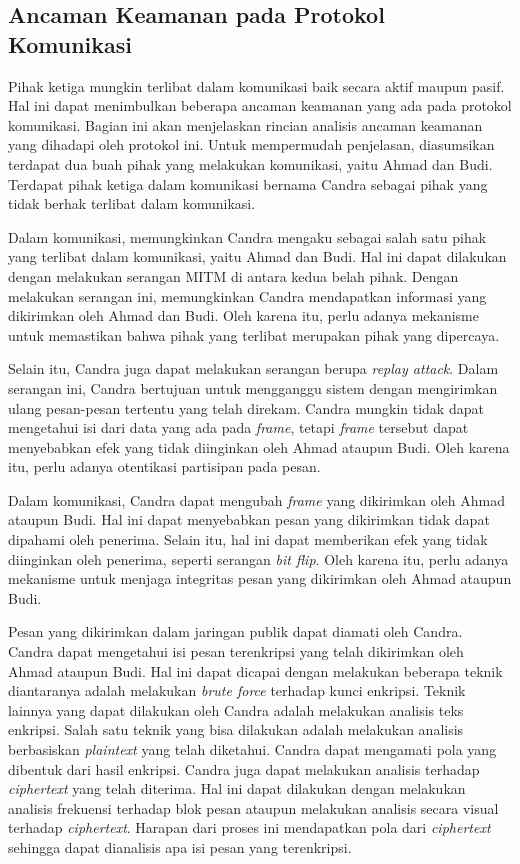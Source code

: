 \subsection{Ancaman Keamanan pada Protokol Komunikasi}
\label{sec:ancaman-keamanan}

Pihak ketiga mungkin terlibat dalam komunikasi baik secara aktif maupun pasif. Hal ini dapat menimbulkan beberapa ancaman keamanan yang ada pada protokol komunikasi. Bagian ini akan menjelaskan rincian analisis ancaman keamanan yang dihadapi oleh protokol ini. Untuk mempermudah penjelasan, diasumsikan terdapat dua buah pihak yang melakukan komunikasi, yaitu Ahmad dan Budi. Terdapat pihak ketiga dalam komunikasi bernama Candra sebagai pihak yang tidak berhak terlibat dalam komunikasi. 

Dalam komunikasi, memungkinkan Candra mengaku sebagai salah satu pihak yang terlibat dalam komunikasi, yaitu Ahmad dan Budi. Hal ini dapat dilakukan dengan melakukan serangan MITM di antara kedua belah pihak. Dengan melakukan serangan ini, memungkinkan Candra mendapatkan informasi yang dikirimkan oleh Ahmad dan Budi. Oleh karena itu, perlu adanya mekanisme untuk memastikan bahwa pihak yang terlibat merupakan pihak yang dipercaya.

Selain itu, Candra juga dapat melakukan serangan berupa \emph{replay attack}. Dalam serangan ini, Candra bertujuan untuk mengganggu sistem dengan mengirimkan ulang pesan-pesan tertentu yang telah direkam. Candra mungkin tidak dapat mengetahui isi dari data yang ada pada \emph{frame}, tetapi \emph{frame} tersebut dapat menyebabkan efek yang tidak diinginkan oleh Ahmad ataupun Budi. Oleh karena itu, perlu adanya otentikasi partisipan pada pesan.

Dalam komunikasi, Candra dapat mengubah \emph{frame} yang dikirimkan oleh Ahmad ataupun Budi. Hal ini dapat menyebabkan pesan yang dikirimkan tidak dapat dipahami oleh penerima. Selain itu, hal ini dapat memberikan efek yang tidak diinginkan oleh penerima, seperti serangan \emph{bit flip}. Oleh karena itu, perlu adanya mekanisme untuk menjaga integritas pesan yang dikirimkan oleh Ahmad ataupun Budi.

Pesan yang dikirimkan dalam jaringan publik dapat diamati oleh Candra. Candra dapat mengetahui isi pesan terenkripsi yang telah dikirimkan oleh Ahmad ataupun Budi. Hal ini dapat dicapai dengan melakukan beberapa teknik diantaranya adalah melakukan \emph{brute force} terhadap kunci enkripsi. Teknik lainnya yang dapat dilakukan oleh Candra adalah melakukan analisis teks enkripsi. Salah satu teknik yang bisa dilakukan adalah melakukan analisis berbasiskan \emph{plaintext} yang telah diketahui. Candra dapat mengamati pola yang dibentuk dari hasil enkripsi. Candra juga dapat melakukan analisis terhadap \emph{ciphertext} yang telah diterima. Hal ini dapat dilakukan dengan melakukan analisis frekuensi terhadap blok pesan ataupun melakukan analisis secara visual terhadap \emph{ciphertext}. Harapan dari proses ini mendapatkan pola dari \emph{ciphertext} sehingga dapat dianalisis apa isi pesan yang terenkripsi.

